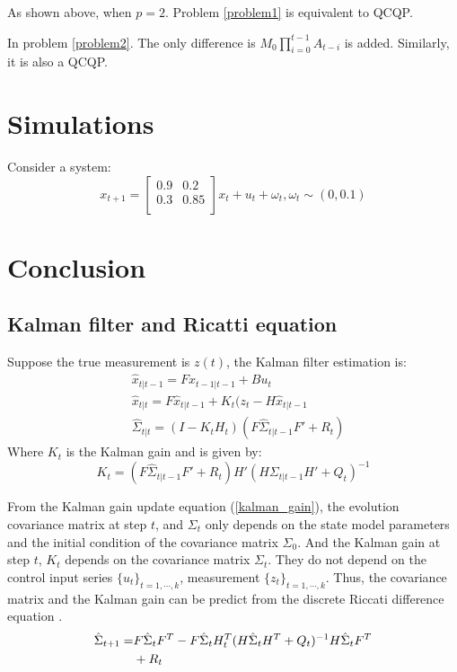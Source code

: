 \documentclass[letterpaper, 10 pt, conference]{ieeeconf}  %
\begin{document}
As shown above, when $p=2$. Problem \ref{problem1} is equivalent to QCQP.

In problem \ref{problem2}. The only difference is $M_0\prod_{i=0}^{t-1}A_{t-i}$ is added. Similarly, it is also a QCQP.

\section{Simulations}
Consider a system:
$$ x_{t+1}=\left[\begin{matrix}
   0.9 & 0.2 \\
   0.3 & 0.85 \\
  \end{matrix} \right] x_{t}+u_t+\omega_t, \omega_t \sim (0,0.1)$$

\section{Conclusion} \label{sec:conc}

\appendix

\subsection{Kalman filter and Ricatti equation}
Suppose the true measurement is $z(t)$, the Kalman filter estimation is:
\begin{align}
\label{filter}
&\hat{x}_{t|t-1} = Fx_{t-1|t-1} + Bu_t\\
&\hat{x}_{t|t}=F\hat{x}_{t|t-1}+K_t(z_t-H\hat{x}_{t|t-1}\\ 
&\hat{\Sigma}_{t|t}=(I - K_t H_t) ( F \hat{\Sigma}_{t|t-1} F' + R_t )
\end{align}
Where $K_t$ is the Kalman gain and is given by:
\begin{equation}
\label{kalman_gain}
K_t = (F \hat{\Sigma}_{t|t-1} F' + R_t)H'(H \Sigma_{t|t-1} H' + Q_t )^{-1}
\end{equation}

From the Kalman gain update equation (\ref{kalman_gain}), the evolution covariance matrix at step $t$, and $\Sigma_t$ only depends on the state model parameters and the initial condition of the covariance matrix $\Sigma_0$. And the Kalman gain at step $t$, $K_t$ depends on the covariance matrix $\Sigma_t$. They do not depend on the control input series $\{u_t\}_{t=1,\cdots,k}$, measurement $\{z_t\}_{t=1,\cdots,k}$. Thus, the covariance matrix and the Kalman gain can be predict from the discrete Riccati difference equation \cite{kumar1986stochastic}.
\begin{equation} \label{Riccati}
\begin{split}
\hat{\Sigma}_{t+1}=&F\hat{\Sigma}_tF^T-F\hat{\Sigma}_tH_{t}^T(H\hat{\Sigma}_tH^T+Q_t)^{-1}H\hat{\Sigma}_tF^T\notag\\
 &+R_t 
 \end{split}
\end{equation}
\end{document}
